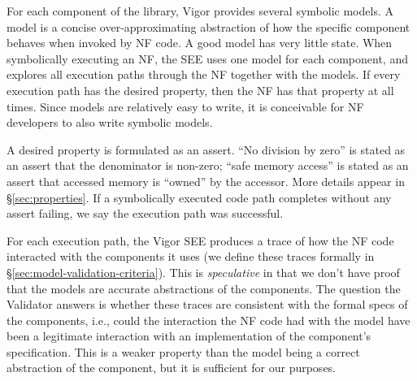 \documentclass[letterpaper,twocolumn,10pt]{article}
\begin{document}


For each component of the library, Vigor provides several symbolic models. A
model is a concise over-approximating abstraction of how the specific component
behaves when invoked by NF code. A good model has very little state. When
symbolically executing an NF, the SEE uses one model for each component, and
explores all execution paths through the NF together with the models. If every
execution path has the desired property, then the NF has that property at all
times. Since models are relatively easy to write, it is conceivable for NF
developers to also write symbolic models.

A desired property is formulated as an assert. ``No division by zero'' is stated
as an assert that the denominator is non-zero; ``safe memory access'' is stated
as an assert that accessed memory is ``owned'' by the accessor. More details
appear in \S\ref{sec:properties}. If a symbolically executed code path completes
without any assert failing, we say the execution path was successful.

For each execution path, the Vigor SEE produces a trace of how the NF code
interacted with the components it uses (we define these traces formally in
\S\ref{sec:model-validation-criteria}). This is {\em speculative} in that we
don't have proof that the models are accurate abstractions of the components.
The question the Validator answers is whether these traces are consistent with
the formal specs of the components, i.e., could the interaction the NF code had
with the model have been a legitimate interaction with an implementation of the
component's specification. This is a weaker property than the model being a
correct abstraction of the component, but it is sufficient for our purposes.
\end{document}

